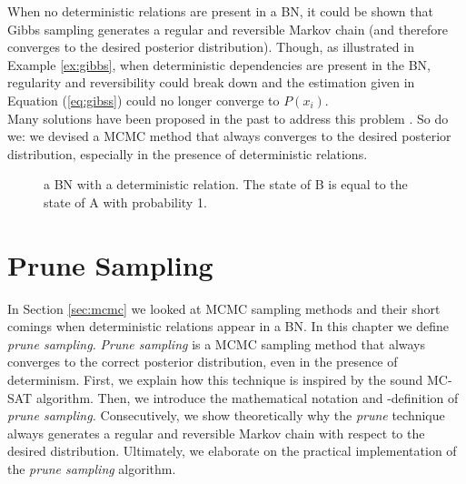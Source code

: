 \documentclass[a4paper, twoside, 11pt]{report}
\theoremstyle{plain}
\theoremstyle{definition}
\theoremstyle{remark}
\newcommand{\ps}{\textit{prune sampling }}
\newcommand{\psp}{\textit{prune sampling. }}
\newcommand{\Ps}{\textit{Prune sampling }}
\begin{document}
When no deterministic relations are present in a BN, it could be shown \cite{poon2006sound} that Gibbs sampling generates a regular and reversible Markov chain (and therefore converges to the desired posterior distribution). Though, as illustrated in Example \ref{ex:gibbs}, when deterministic dependencies are present in the BN, regularity and reversibility could break down and the estimation given in Equation (\ref{eq:gibss}) could no longer converge to $P(x_i)$. \\
Many solutions have been proposed in the past to address this problem \cite{venugopal2013giss, poon2006sound}. So do we: we devised a MCMC method that always converges to the desired posterior distribution, especially in the presence of deterministic relations.
\begin{center}
\begin{figure}[h!]
\centering
{}
\caption{a BN with a deterministic relation. The state of B is equal to the state of A with probability 1.}
\label{gibbs}
\end{figure}
\end{center}

\chapter{Prune Sampling}\label{ch:3}
In Section \ref{sec:mcmc} we looked at MCMC sampling methods and their short comings when deterministic relations appear in a BN. In this chapter we define \psp \Ps is a MCMC sampling method that always converges to the correct posterior distribution, even in the presence of determinism. First, we explain how this technique is inspired by the sound MC-SAT algorithm. Then, we introduce the mathematical notation and -definition of \psp Consecutively, we show theoretically why the \textit{prune} technique always generates a regular and reversible Markov chain with respect to the desired distribution. Ultimately, we elaborate on the practical implementation of the \ps algorithm.
\end{document}
